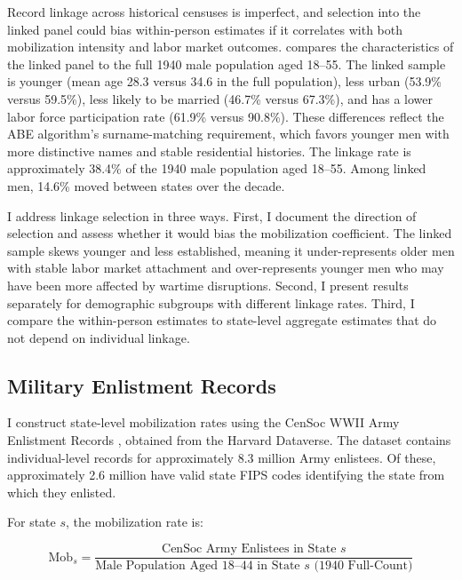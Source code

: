 \documentclass[12pt]{article}
\begin{document}
Record linkage across historical censuses is imperfect, and selection into the linked panel could bias within-person estimates if it correlates with both mobilization intensity and labor market outcomes.  compares the characteristics of the linked panel to the full 1940 male population aged 18--55. The linked sample is younger (mean age 28.3 versus 34.6 in the full population), less urban (53.9\% versus 59.5\%), less likely to be married (46.7\% versus 67.3\%), and has a lower labor force participation rate (61.9\% versus 90.8\%). These differences reflect the ABE algorithm's surname-matching requirement, which favors younger men with more distinctive names and stable residential histories. The linkage rate is approximately 38.4\% of the 1940 male population aged 18--55. Among linked men, 14.6\% moved between states over the decade.

I address linkage selection in three ways. First, I document the direction of selection and assess whether it would bias the mobilization coefficient. The linked sample skews younger and less established, meaning it under-represents older men with stable labor market attachment and over-represents younger men who may have been more affected by wartime disruptions. Second, I present results separately for demographic subgroups with different linkage rates. Third, I compare the within-person estimates to state-level aggregate estimates that do not depend on individual linkage.



\subsection{Military Enlistment Records}

I construct state-level mobilization rates using the CenSoc WWII Army Enlistment Records \citep{cenSoc2024}, obtained from the Harvard Dataverse. The dataset contains individual-level records for approximately 8.3 million Army enlistees. Of these, approximately 2.6 million have valid state FIPS codes identifying the state from which they enlisted.

For state $s$, the mobilization rate is:

\begin{equation}
\text{Mob}_s = \frac{\text{CenSoc Army Enlistees in State } s}{\text{Male Population Aged 18--44 in State } s \text{ (1940 Full-Count)}}
\end{equation}
\end{document}
